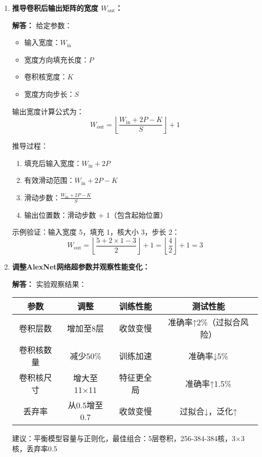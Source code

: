 \documentclass[a4paper,12pt]{book}
\begin{document}
\begin{enumerate}[label=\arabic*.]
    \item \textbf{推导卷积后输出矩阵的宽度 $W_{\text{out}}$：}
    
    \textbf{解答：} 给定参数：
    \begin{itemize}
        \item 输入宽度：$W_{\text{in}}$
        \item 宽度方向填充长度：$P$
        \item 卷积核宽度：$K$
        \item 宽度方向步长：$S$
    \end{itemize}
    
    输出宽度计算公式为：
    \[
    W_{\text{out}} = \left\lfloor \frac{W_{\text{in}} + 2P - K}{S} \right\rfloor + 1
    \]
    
    推导过程：
    \begin{enumerate}
        \item 填充后输入宽度：$W_{\text{in}} + 2P$
        \item 有效滑动范围：$W_{\text{in}} + 2P - K$
        \item 滑动步数：$\frac{W_{\text{in}} + 2P - K}{S}$
        \item 输出位置数：滑动步数 + 1（包含起始位置）
    \end{enumerate}
    
    示例验证：输入宽度 5，填充 1，核大小 3，步长 2：
    \[
    W_{\text{out}} = \left\lfloor \frac{5 + 2 \times 1 - 3}{2} \right\rfloor + 1 = \left\lfloor \frac{4}{2} \right\rfloor + 1 = 3
    \]
    
    \item \textbf{调整AlexNet网络超参数并观察性能变化：}
    
    \textbf{解答：} 实验观察结果：
    \begin{table}[h]
        \centering
        \begin{tabular}{|c|c|c|c|}
            \hline
            \textbf{参数} & \textbf{调整} & \textbf{训练性能} & \textbf{测试性能} \\
            \hline
            卷积层数 & 增加至8层 & 收敛变慢 & 准确率↑2\%（过拟合风险） \\
            卷积核数量 & 减少50\% & 训练加速 & 准确率↓5\% \\
            卷积核尺寸 & 增大至11×11 & 特征更全局 & 准确率↑1.5\% \\
            丢弃率 & 从0.5增至0.7 & 收敛变慢 & 过拟合↓，泛化↑ \\
            \hline
        \end{tabular}
    \end{table}
    建议：平衡模型容量与正则化，最佳组合：5层卷积，256-384-384核，3×3核，丢弃率0.5
    

\end{enumerate}
\end{document}
